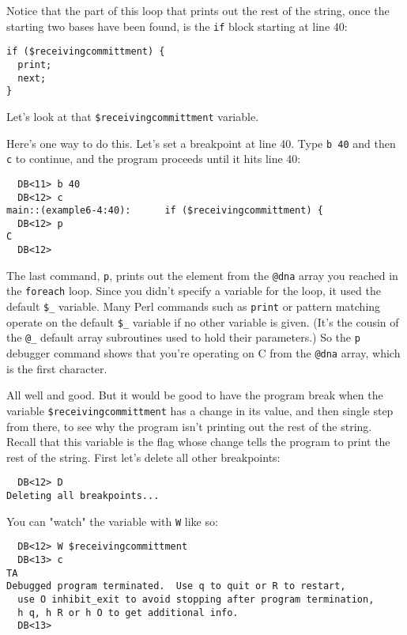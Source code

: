 Notice that the part of this loop that prints out the rest of the string, once the starting two bases have been found, is the \verb|if| block starting at line 40: 

\begin{lstlisting}
if ($receivingcommittment) {
  print;
  next;
}
\end{lstlisting}

Let's look at that \verb|$receivingcommittment| variable.

Here's one way to do this. Let's set a breakpoint at line 40. Type \verb|b 40| and then \verb|c| to continue, and the program proceeds until it hits line 40: 

\begin{lstlisting}
  DB<11> b 40
  DB<12> c
main::(example6-4:40):      if ($receivingcommittment) {
  DB<12> p
C
  DB<12> 
\end{lstlisting}

The last command, \verb|p|, prints out the element from the \verb|@dna| array you reached in the \verb|foreach| loop. Since you didn't specify a variable for the loop, it used the default \verb|$_| variable. Many Perl commands such as \verb|print| or pattern matching operate on the default \verb|$_| variable if no other variable is given. (It's the cousin of the \verb|@_| default array subroutines used to hold their parameters.) So the \verb|p| debugger command shows that you're operating on C from the \verb|@dna| array, which is the first character.

All well and good. But it would be good to have the program break when the variable \verb|$receivingcommittment| has a change in its value, and then single step from there, to see why the program isn't printing out the rest of the string. Recall that this variable is the flag whose change tells the program to print the rest of the string. First let's delete all other breakpoints: 

\begin{lstlisting}
  DB<12> D
Deleting all breakpoints...
\end{lstlisting}

You can "watch" the variable with \verb|W| like so: 

\begin{lstlisting}
  DB<12> W $receivingcommittment
  DB<13> c
TA
Debugged program terminated.  Use q to quit or R to restart,
  use O inhibit_exit to avoid stopping after program termination,
  h q, h R or h O to get additional info.  
  DB<13> 
\end{lstlisting}

